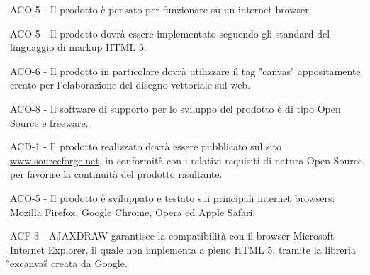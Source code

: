 \begin{elenconumerato}{\subsubsecindent}
\item ACO-5 - Il prodotto \`e pensato per funzionare su un internet browser.
\item ACO-5 - Il prodotto dovr\`a essere implementato seguendo gli standard del \underline{linguaggio di markup} HTML 5.
\item ACO-6 - Il prodotto in particolare dovr\` a utilizzare il tag "canvas" appositamente creato per l'elaborazione del disegno vettoriale sul web.
\item ACO-8 - Il software di supporto per lo sviluppo del prodotto \`e di tipo Open Source e freeware.
\item ACD-1 - Il prodotto realizzato dovr\`a essere pubblicato sul sito \href{www.sourceforge.net}{www.sourceforge.net}, in conformit\`a con i relativi requisiti di natura Open Source, per favorire la continuit\`a del prodotto risultante.
\item ACO-5 - Il prodotto \`e sviluppato e testato sui principali internet browsers: Mozilla Firefox, Google Chrome, Opera ed Apple Safari.
\end{elenconumerato}
\begin{elenconumerato}{\subsubsecindent}
\item{ACF-3 - AJAXDRAW garantisce la compatibilit\`a con il browser Microsoft Internet Explorer, il quale non implementa a pieno HTML 5, tramite la libreria \H{}excanvas\H{} creata da Google.}
\end{elenconumerato}

\newpage

